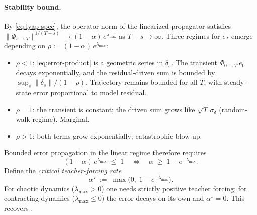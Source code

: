 \paragraph{Stability bound.}
By \eqref{eq:lyap-spec}, the operator norm of the linearized
propagator satisfies
$\|\Phi_{s\to T}\|^{1/(T-s)} \to (1-\alpha)\,e^{\lambda_{\max}}$ as
$T-s \to \infty$. Three regimes for $e_T$ emerge depending on
$\rho := (1-\alpha)\,e^{\lambda_{\max}}$:
%
\begin{itemize}
  \item $\rho < 1$: \eqref{eq:error-product} is a geometric series in
  $\delta_s$. The transient $\Phi_{0\to T}\,e_0$ decays exponentially,
  and the residual-driven sum is bounded by
  $\sup_s\|\delta_s\|/(1-\rho)$. Trajectory remains bounded for all
  $T$, with steady-state error proportional to model residual.
  \item $\rho = 1$: the transient is constant; the driven sum grows
  like $\sqrt{T}\,\sigma_\delta$ (random-walk regime). Marginal.
  \item $\rho > 1$: both terms grow exponentially; catastrophic
  blow-up.
\end{itemize}
%
Bounded error propagation in the linear regime therefore requires
%
\begin{equation}
  (1 - \alpha)\,e^{\lambda_{\max}} \;\le\; 1
  \quad\Longleftrightarrow\quad
  \alpha \;\ge\; 1 - e^{-\lambda_{\max}}.
  \label{eq:critical-bound}
\end{equation}
%
Define the \emph{critical teacher-forcing rate}
%
\begin{equation}
  \boxed{\;\alpha^\star \;:=\; \max\!\bigl(0,\;1 - e^{-\lambda_{\max}}\bigr).\;}
  \label{eq:alpha-star}
\end{equation}
%
For chaotic dynamics ($\lambda_{\max} > 0$) one needs strictly
positive teacher forcing; for contracting dynamics
($\lambda_{\max} \le 0$) the error decays on its own and $\alpha^\star = 0$.
This recovers \citet[Theorem~1]{HessEtAl2023}.

